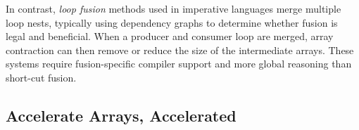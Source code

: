 In contrast, \emph{loop fusion} methods used in imperative
languages merge multiple loop nests, typically using dependency
graphs to determine whether fusion is legal and beneficial.
When a producer and consumer loop are merged, array
contraction can then remove or reduce the size of the
intermediate arrays. These systems require fusion-specific compiler support and
more global reasoning than short-cut fusion.


\subsection{Accelerate Arrays, Accelerated}

% 
% 
% 
% 

